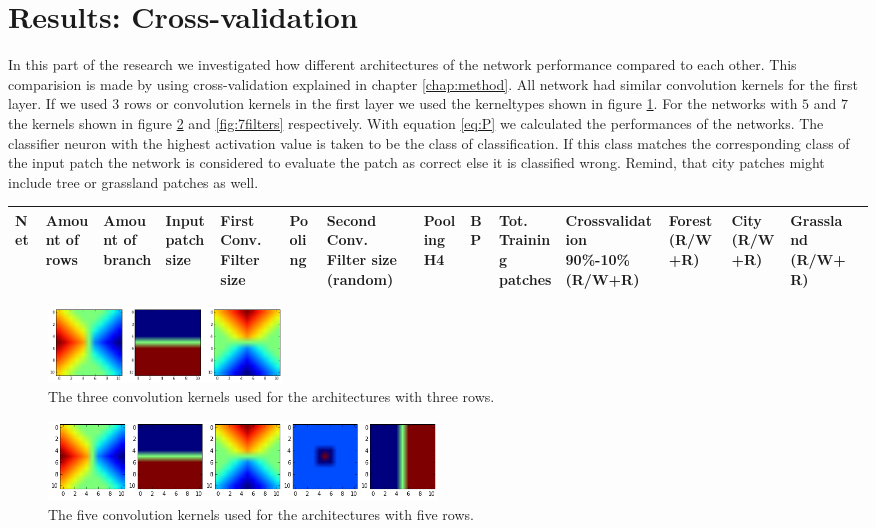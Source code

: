\documentclass[a4paper,onecolumn]{report}
\begin{document}
\section{Results: Cross-validation}
In this part of the research we investigated how different architectures of the network performance compared to each other. This comparision is made by using cross-validation explained in chapter \ref{chap:method}. All network had similar convolution kernels for the first layer. If we used $3$ rows or convolution kernels in the first layer we used the kerneltypes shown in figure \ref{fig:3filters}. For the networks with $5$ and $7$ the kernels shown in figure \ref{fig:5filters} and \ref{fig:7filters} respectively.
With equation \ref{eq:P} we calculated the performances of the networks. The classifier neuron with the highest activation value is taken to be the class of classification. If this class matches the corresponding class of the input patch the network is considered to evaluate the patch as correct else it is classified wrong. Remind, that city patches might include tree or grassland patches as well.

\begin{tiny}
\begin{center}
	\begin{tabular}{| l |p{0.75cm} |p{0.75cm} |p{0.75cm} |p{0.75cm} |p{0.75cm} |p{0.75cm} |p{0.75cm} |p{0.75cm} |p{0.75cm} |p{0.75cm} |p{0.75cm} |p{0.75cm} |p{1cm} |r | }
		\hline
		Net	& Amount of rows	& Amount of branch	& Input patch size	& First Conv. Filter size	& Pooling	& Second Conv. Filter size (random)&	Pooling	H4	&BP	&Tot. Training patches	& Crossvalidation 90\%-10\% (R/W+R)	& Forest (R/W+R)&	City (R/W+R)	& Grassland (R/W+R) \\ \hline

  \end{tabular}
\end{center}
\end{tiny}	


\begin{figure}[bth]
	\centering
	\includegraphics[width=0.3\textwidth]{./images/3filters.jpg}
	\caption{The three convolution kernels used for the architectures with three rows.}
	\label{fig:3filters}
\end{figure}

\begin{figure}[bth]
	\centering
	\includegraphics[width=0.5\textwidth]{./images/5filters.jpg}
	\caption{The five convolution kernels used for the architectures with five rows.}
	\label{fig:5filters}
\end{figure}
\end{document}
